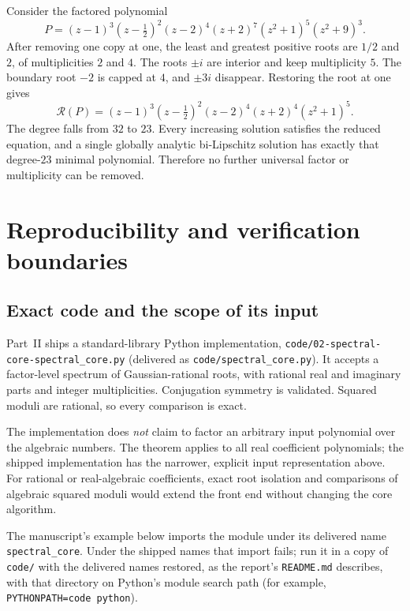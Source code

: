 \documentclass[11pt,letterpaper]{article}
\theoremstyle{definition}
\theoremstyle{remark}
\newcommand{\core}{\mathcal R}
\begin{document}
Consider the factored polynomial
\begin{equation}
 P=(z-1)^3(z-\tfrac12)^2(z-2)^4(z+2)^7
       (z^2+1)^5(z^2+9)^3.
 \label{nrr:sc:eq:largeP}
\end{equation}
After removing one copy at one, the least and greatest positive roots
are $1/2$ and $2$, of multiplicities $2$ and $4$.
The roots $\pm i$ are interior and keep multiplicity $5$.
The boundary root $-2$ is capped at $4$, and $\pm3i$ disappear.
Restoring the root at one gives
\begin{equation}
 \boxed{\core(P)=(z-1)^3(z-\tfrac12)^2(z-2)^4(z+2)^4(z^2+1)^5.}
 \label{nrr:sc:eq:largecore}
\end{equation}
The degree falls from $32$ to $23$. Every increasing solution satisfies
the reduced equation, and a single globally analytic bi-Lipschitz
solution has exactly that degree-$23$ minimal polynomial.
Therefore no further universal factor or multiplicity can be removed.

\section{Reproducibility and verification boundaries}
\label{nrr:sc:sec:verification}

\subsection{Exact code and the scope of its input}

Part~II ships a standard-library Python implementation,
\nolinkurl{code/02-spectral-core-spectral_core.py} (delivered as
\texttt{code/spectral\_core.py}). It accepts a factor-level spectrum of
Gaussian-rational roots, with rational real and imaginary parts and
integer multiplicities. Conjugation symmetry is validated. Squared
moduli are rational, so every comparison is exact.

The implementation does \emph{not} claim to factor an arbitrary input
polynomial over the algebraic numbers. The theorem applies to all real
coefficient polynomials; the shipped implementation has the narrower,
explicit input representation above. For rational or real-algebraic
coefficients, exact root isolation and comparisons of algebraic squared
moduli would extend the front end without changing the core algorithm.

The manuscript's example below imports the module under its delivered name
\texttt{spectral\_core}. Under the shipped names that import fails; run it in
a copy of \texttt{code/} with the delivered names restored, as the report's
\texttt{README.md} describes, with that directory on Python's module search
path (for example, \texttt{PYTHONPATH=code python}).
\end{document}
